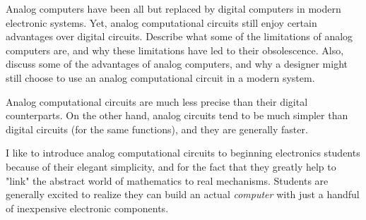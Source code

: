 

Analog computers have been all but replaced by digital computers in modern electronic systems.  Yet, analog computational circuits still enjoy certain advantages over digital circuits.  Describe what some of the limitations of analog computers are, and why these limitations have led to their obsolescence.  Also, discuss some of the advantages of analog computers, and why a designer might still choose to use an analog computational circuit in a modern system.







Analog computational circuits are much less precise than their digital counterparts.  On the other hand, analog circuits tend to be much simpler than digital circuits (for the same functions), and they are generally faster.







I like to introduce analog computational circuits to beginning electronics students because of their elegant simplicity, and for the fact that they greatly help to "link" the abstract world of mathematics to real mechanisms.  Students are generally excited to realize they can build an actual {\it computer} with just a handful of inexpensive electronic components.




